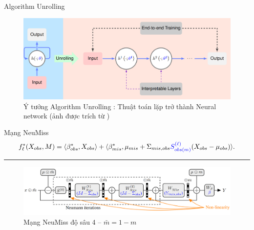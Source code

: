 \documentclass[aspectratio=169, 10pt]{beamer} %
\begin{document}
\begin{frame}{Algorithm Unrolling}
    \begin{figure}
        \centering
        \includegraphics[width=0.9\linewidth]{unrolling.png}
        \caption{Ý tưởng Algorithm Unrolling \cite{gregor2010unroll}: Thuật toán lặp trở thành Neural network (ảnh được trích từ \cite{monga2021unroll})}
        \label{fig:algorithm-unrolling}
    \end{figure}
\end{frame}


\begin{frame}{Mạng NeuMiss}
    \begin{equation*}\label{eq:l_approximation_mcar_bayes_predictor}
        f_{\ell}^* (X_{obs}, M) = \langle {\beta_{obs}^{*}}, X_{obs} \rangle + \langle {\beta_{mis}^{*}}, \mu_{mis} + {\Sigma_{mis,obs}} \textcolor{blue}{S_{obs(m)}^{(\ell)}} (X_{obs}-\mu_{obs})\rangle.
    \end{equation*}
    \hrule
    \begin{figure}
        \centering
        \includegraphics[width=\linewidth]{neumiss_network.png}
        \caption{Mạng NeuMiss độ sâu 4 -- $\bar{m} = 1 - m$}
        \label{fig:neumiss}
    \end{figure}    
\end{frame}
\end{document}
